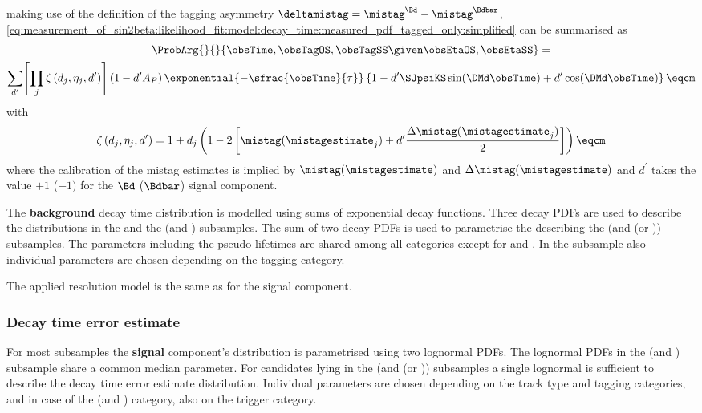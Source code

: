 making use of the definition of the tagging asymmetry $\deltamistag =
\mistag^{\Bd} - \mistag^{\Bdbar}$, 
\cref{eq:measurement_of_sin2beta:likelihood_fit:model:decay_time:measured_pdf_tagged_only:simplified} 
can be summarised as
%
\begin{multline}
  \ProbArg{}{}{\obsTime, \obsTagOS, \obsTagSS \given \obsEtaOS, \obsEtaSS} = \\
  \sum_{d^\prime} \Biggl[ \prod_{j} \zeta \left( d_j, \eta_j, d^{\prime} \right) \Biggr] \left( 1 - d^\prime A_P \right) \exponential{-\sfrac{\obsTime}{\tau}} \left\{ 1 - d^\prime \SJpsiKS \sin (\DMd \obsTime) + d^\prime \cos (\DMd \obsTime) \right\} \eqcm
\end{multline}
%
with
%
\begin{equation}
  \zeta \left( d_j, \eta_j, d^{\prime} \right) = 1 + d_j \left( 1 - 2 \left[ \mistag(\mistagestimate_j) + d^{\prime} \frac{\Delta\mistag(\mistagestimate_j)}{2} \right] \right) \eqcm
\end{equation}
%
where the calibration of the mistag estimates is implied by
$\mistag(\mistagestimate)$ and $\Delta\mistag(\mistagestimate)$ and $d^\prime$
takes the value $+1$ ($-1)$ for the $\Bd$ ($\Bdbar$) signal component.

The \textbf{background} decay time distribution is modelled using sums of
exponential decay functions. Three decay \acp{PDF} are used to describe the
distributions in the \catLL and the (\catDD and \catOS) subsamples. The sum of
two decay \acp{PDF} is used to parametrise the \PDF describing the (\catDD and
(\catSS or \catBS)) subsamples. The \PDF parameters including the
pseudo-lifetimes are shared among all categories except for \catDD and \catLL.
In the \catDD subsample also individual parameters are chosen depending on the
tagging category. 

The applied resolution model is the same as for the signal component.

\subsubsection{Decay time error estimate}
\label{sec:measurement_of_sin2beta:likelihood_fit:model:decay_time_error}

For most subsamples the \textbf{signal} component's distribution is parametrised
using two lognormal \acp{PDF}. The lognormal \acp{PDF} in the (\catLL and
\catOS) subsample share a common median parameter. For candidates lying in the
(\catLL and (\catSS or \catBS)) subsamples a single lognormal \PDF is sufficient
to describe the decay time error estimate distribution. Individual parameters
are chosen depending on the track type and tagging categories, and in case of
the (\catDD and \catOS) category, also on the trigger category.


